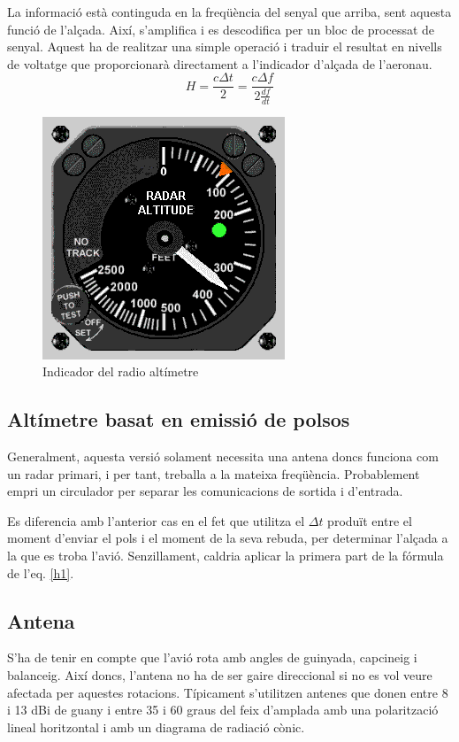 La informació està continguda en la freqüència del senyal que arriba, sent aquesta funció de l'alçada. Així, s'amplifica i  es descodifica   per un bloc de processat de senyal. Aquest ha de realitzar una simple operació i traduir el resultat en nivells de voltatge que proporcionarà directament a l'indicador d'alçada de l'aeronau.
\begin{equation}
\label{h1}
H=\frac{c\Delta t}{2}=\frac{c\Delta f}{2\frac{df}{dt}}
\end{equation}
\begin{figure}[H]
	\centering
	\includegraphics[scale=0.4]{./img/panel}
	\caption{Indicador del radio altímetre}
\end{figure}
\subsection{Altímetre basat en emissió de polsos}
Generalment, aquesta versió solament necessita una antena doncs funciona com un radar primari, i per tant, treballa a la mateixa freqüència. Probablement empri un circulador per separar les comunicacions de sortida i d'entrada. 

Es diferencia amb l'anterior cas en el fet que utilitza el $\Delta t$ produït entre el moment d'enviar el pols i el moment de la seva rebuda, per determinar l'alçada a la que es troba l'avió. Senzillament, caldria aplicar la primera part de la fórmula de l'eq. \ref{h1}.

\subsection{Antena}
S'ha de tenir en compte  que l'avió rota amb angles de guinyada, capcineig i balanceig. Així doncs, l'antena no ha de ser gaire direccional si no es vol veure afectada per aquestes rotacions. Típicament s'utilitzen antenes que donen entre 8 i 13 dBi de guany i entre 35 i 60 graus del feix d'amplada amb una polarització lineal horitzontal i amb un diagrama de radiació cònic.

